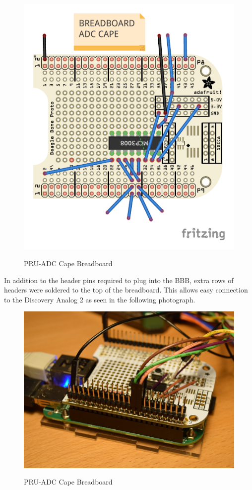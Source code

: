 \begin{figure}[H]
	\centering
	\includegraphics[]{../../pcb/adafruit_proto_cape_bb}
	\centering\bfseries
	\caption{PRU-ADC Cape Breadboard}
\end{figure}

In addition to the header pins required to plug into the BBB, extra rows of headers were soldered to the top of the breadboard.  This allows easy connection to the Discovery Analog 2 as seen in the following photograph.

\begin{figure}[H]
	\centering
	\includegraphics{photos/DSC_0025}
	\centering\bfseries
	\caption{PRU-ADC Cape Breadboard}
\end{figure}

